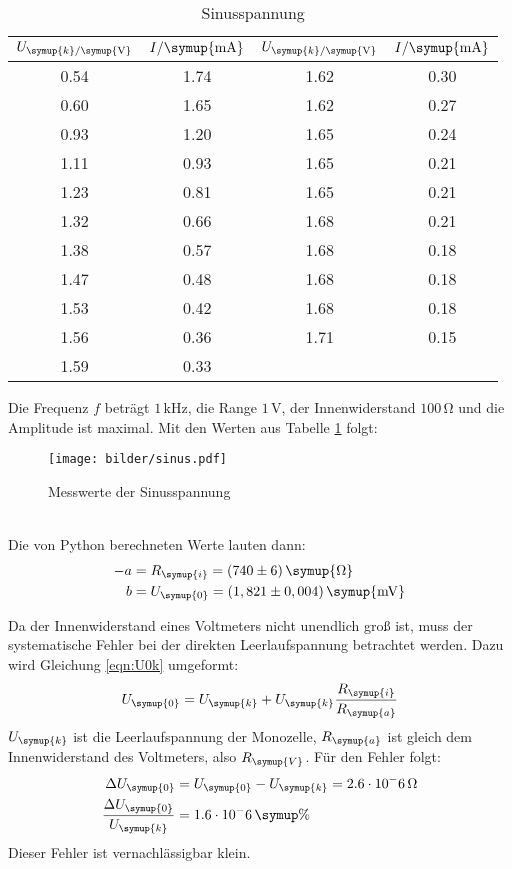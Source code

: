 \begin{table}[H]
  \centering
  \begin{tabular}{c c c c}
    \toprule
    $U_{\symup{k}/\symup{\si{\volt}}}$ & $I/\symup{\si{\milli\ampere}}$  &
    $U_{\symup{k}/\symup{\si{\volt}}}$ & $I/\symup{\si{\milli\ampere}}$  \\
    \midrule
    0.54   &  1.74  &  1.62  &  0.30  \\
    0.60   &  1.65  &  1.62  &  0.27  \\
    0.93   &  1.20  &  1.65  &  0.24  \\
    1.11   &  0.93  &  1.65  &  0.21  \\
    1.23   &  0.81  &  1.65  &  0.21  \\
    1.32   &  0.66  &  1.68  &  0.21  \\
    1.38   &  0.57  &  1.68  &  0.18  \\
    1.47   &  0.48  &  1.68  &  0.18  \\
    1.53   &  0.42  &  1.68  &  0.18  \\
    1.56   &  0.36  &  1.71  &  0.15  \\
    1.59   &  0.33  &  \hrulefill  & \hrulefill  \\
    \bottomrule
  \end{tabular}
  \caption{Sinusspannung}
  \label{tab:sin}
\end{table}
Die Frequenz $f$ beträgt $1\,\si{\kilo\hertz}$, die Range $1\,\si{\volt}$, der
Innenwiderstand $100\,\si{\ohm}$ und die Amplitude ist maximal.
Mit den Werten aus Tabelle \ref{tab:sin} folgt:
\begin{figure}[h]
  \centering
  \texttt{[image: bilder/sinus.pdf]}
  \caption{Messwerte der Sinusspannung}
  \label{fig:si}
\end{figure}
\\
Die von Python berechneten Werte lauten dann:
\begin{align*}
   -a &= R_\symup{i} = (740 \pm 6)\, \symup{\si{\ohm}} \\
   b &= U_\symup{0} = (1,821 \pm 0,004)\,\symup{\si{\milli\volt}}
\end{align*}

Da der Innenwiderstand eines Voltmeters nicht unendlich groß ist, muss der systematische
Fehler bei der direkten Leerlaufspannung betrachtet werden. Dazu wird Gleichung
\eqref{eqn:U0k} umgeformt:
\begin{equation}
  U_\symup{0} = U_\symup{k} + U_\symup{k} \frac{R_\symup{i}}{R_\symup{a}}
\end{equation}
$U_\symup{k}$ ist die Leerlaufspannung der Monozelle, $R_\symup{a}$ ist gleich dem
Innenwiderstand des Voltmeters, also $R_\symup{V}$.
Für den Fehler folgt:
\begin{align*}
  \Delta U_\symup{0} &= U_\symup{0} - U_\symup{k} = 2.6 \cdot 10^-6 \,\si{\ohm} \\
  \frac{\Delta U_\symup{0}}{U_\symup{k}} &= 1.6 \cdot 10^-6 \, \symup{\%}
\end{align*}
Dieser Fehler ist vernachlässigbar klein.

